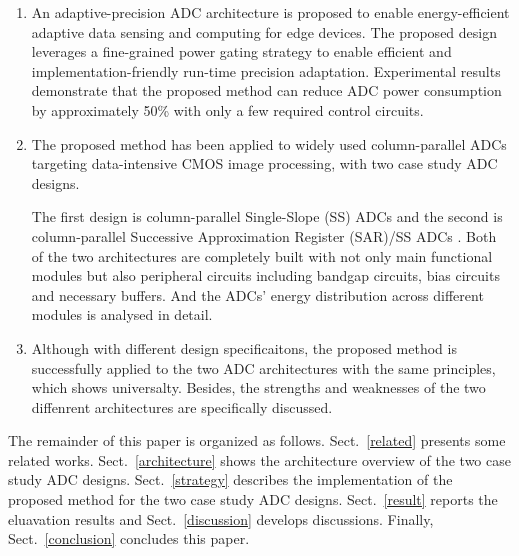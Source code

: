 \begin{enumerate}[\IEEEsetlabelwidth{3)}]
	\item 
	An adaptive-precision ADC architecture is proposed to enable energy-efficient adaptive data sensing and computing for edge devices. The proposed design leverages a fine-grained power gating strategy to enable efficient and implementation-friendly run-time precision adaptation.
	Experimental results demonstrate that the proposed method can reduce ADC power consumption by approximately 50\% with only a few required control circuits.
	\item 
	The proposed method has been applied to widely used column-parallel ADCs targeting data-intensive CMOS image processing\cite{kim_11-bit_2021,nie_single_2020,kumagai_14-inch_2018,park_640_2020}, with two case study ADC designs.
	
	The first design is column-parallel Single-Slope (SS) ADCs \cite{snoeij_18v_2005,kleinfelder_10000_2001} and the second is column-parallel Successive Approximation Register (SAR)/SS ADCs \cite{kim_area-efficient_2016}.
	Both of the two architectures are completely built with not only main functional modules but also peripheral circuits including bandgap circuits, bias circuits and necessary buffers. And the ADCs' energy distribution across different modules is analysed  in detail. 
	\item 
	Although with different design specificaitons, the proposed method is successfully applied to the two ADC architectures with the same principles, which shows universalty. Besides, the strengths and weaknesses of the two diffenrent architectures are specifically discussed.
\end{enumerate} 

The remainder of this paper is organized as follows. 
Sect.~\ref{related} presents some related works.
Sect.~\ref{architecture} shows the architecture overview of the two case study ADC designs. 
Sect.~\ref{strategy} describes the implementation of the proposed method for the two case study ADC designs. 
Sect.~\ref{result} reports the eluavation results and Sect.~\ref{discussion} develops discussions. 
Finally, Sect.~\ref{conclusion} concludes this paper.